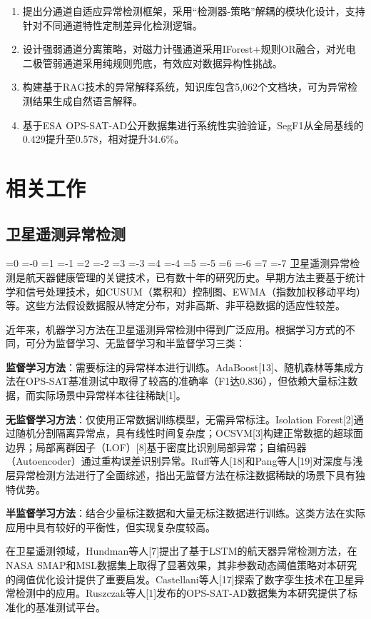 \documentclass[12pt, a4paper]{article}
\newcommand{\zihao}[1]{%
    \ifnum#1=0 {\fontsize{42pt}{50pt}\selectfont}%
    \else\ifnum#1=-0 {\fontsize{36pt}{44pt}\selectfont}%
    \else\ifnum#1=1 {\fontsize{26pt}{32pt}\selectfont}%
    \else\ifnum#1=-1 {\fontsize{24pt}{28pt}\selectfont}%
    \else\ifnum#1=2 {\fontsize{22pt}{26pt}\selectfont}%
    \else\ifnum#1=-2 {\fontsize{18pt}{22pt}\selectfont}%
    \else\ifnum#1=3 {\fontsize{16pt}{20pt}\selectfont}%
    \else\ifnum#1=-3 {\fontsize{15pt}{18pt}\selectfont}%
    \else\ifnum#1=4 {\fontsize{14pt}{17pt}\selectfont}%
    \else\ifnum#1=-4 {\fontsize{12pt}{15pt}\selectfont}%
    \else\ifnum#1=5 {\fontsize{10.5pt}{13pt}\selectfont}%
    \else\ifnum#1=-5 {\fontsize{9pt}{11pt}\selectfont}%
    \else\ifnum#1=6 {\fontsize{7.5pt}{9pt}\selectfont}%
    \else\ifnum#1=-6 {\fontsize{6.5pt}{8pt}\selectfont}%
    \else\ifnum#1=7 {\fontsize{5.5pt}{7pt}\selectfont}%
    \else\ifnum#1=-7 {\fontsize{5pt}{6pt}\selectfont}%
    \fi\fi\fi\fi\fi\fi\fi\fi\fi\fi\fi\fi\fi\fi\fi\fi
}
\newcommand{\songti}{\CJKfontspec{SimSun}}
\begin{document}
\begin{enumerate}[label=(\arabic*)]
    \item 提出分通道自适应异常检测框架，采用``检测器-策略''解耦的模块化设计，支持针对不同通道特性定制差异化检测逻辑。
    \item 设计强弱通道分离策略，对磁力计强通道采用IForest+规则OR融合，对光电二极管弱通道采用纯规则兜底，有效应对数据异构性挑战。
    \item 构建基于RAG技术的异常解释系统，知识库包含5,062个文档块，可为异常检测结果生成自然语言解释。
    \item 基于ESA OPS-SAT-AD公开数据集进行系统性实验验证，SegF1从全局基线的0.429提升至0.578，相对提升34.6\%。
\end{enumerate}

\section{相关工作}

\subsection{卫星遥测异常检测}

\zihao{5}\songti
卫星遥测异常检测是航天器健康管理的关键技术，已有数十年的研究历史。早期方法主要基于统计学和信号处理技术，如CUSUM（累积和）控制图、EWMA（指数加权移动平均）等。这些方法假设数据服从特定分布，对非高斯、非平稳数据的适应性较差。

近年来，机器学习方法在卫星遥测异常检测中得到广泛应用。根据学习方式的不同，可分为监督学习、无监督学习和半监督学习三类：

\textbf{监督学习方法}：需要标注的异常样本进行训练。AdaBoost[13]、随机森林等集成方法在OPS-SAT基准测试中取得了较高的准确率（F1达0.836），但依赖大量标注数据，而实际场景中异常样本往往稀缺[1]。

\textbf{无监督学习方法}：仅使用正常数据训练模型，无需异常标注。Isolation Forest[2]通过随机分割隔离异常点，具有线性时间复杂度；OCSVM[3]构建正常数据的超球面边界；局部离群因子（LOF）[8]基于密度比识别局部异常；自编码器（Autoencoder）通过重构误差识别异常。Ruff等人[18]和Pang等人[19]对深度与浅层异常检测方法进行了全面综述，指出无监督方法在标注数据稀缺的场景下具有独特优势。

\textbf{半监督学习方法}：结合少量标注数据和大量无标注数据进行训练。这类方法在实际应用中具有较好的平衡性，但实现复杂度较高。

在卫星遥测领域，Hundman等人[7]提出了基于LSTM的航天器异常检测方法，在NASA SMAP和MSL数据集上取得了显著效果，其非参数动态阈值策略对本研究的阈值优化设计提供了重要启发。Castellani等人[17]探索了数字孪生技术在卫星异常检测中的应用。Ruszczak等人[1]发布的OPS-SAT-AD数据集为本研究提供了标准化的基准测试平台。
\end{document}
